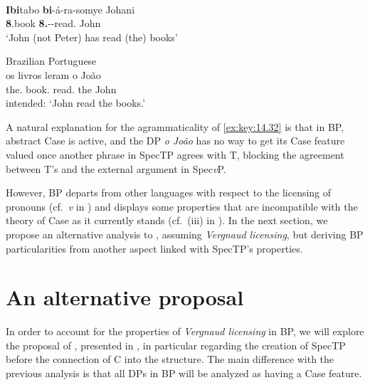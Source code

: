\documentclass[output=paper]{langsci/langscibook}
\begin{document}
\ea%
    \label{ex:key:14.31} \parencite[723]{Carstens2011}\\
    \gll    \textbf{Ibi}tabo \textbf{bi}-á-ra-somye Johani\\
            \textbf{8}.book \textbf{8.\Sm}-\Pst{}-read.\Pfv{} John\\
    \glt    ‘John (not Peter) has read (the) books’
\z

\ea\label{ex:key:14.32}Brazilian Portuguese\\
    \gll    \llap{*}os livros leram o João\\
            the.\Pl{} book.\Pl{} read.\Tpl{} the John\\
    \glt    intended: \enquote*{John read the books.}
\z

A natural explanation for the agrammaticality of \eqref{ex:key:14.32} is that
in \gls{BP}, abstract Case is active, and the DP \emph{o João} has no way to
get its Case feature valued once another phrase in SpecTP agrees with T,
blocking the agreement between T’s  and the external argument in
Spec\emph{v}P.

However, \gls{BP} departs from other  languages with respect to the
licensing of pronouns (cf.\ \emph{v} in ) and displays some
properties that are incompatible with the theory of Case as it currently stands
(cf.\ (iii) in ). In the next section, we propose an
alternative analysis to \textcite{AvelarGalves2011,AvelarGalves2016}, assuming
\emph{Vergnaud licensing}, but deriving \gls{BP} particularities from another
aspect linked with SpecTP’s properties.

\section{An alternative proposal}\label{sec:key:14.5}

In order to account for the properties of \emph{Vergnaud licensing} in
\gls{BP}, we will explore the proposal of
\textcite{AvelarGalves2011,AvelarGalves2016}, presented in
, in particular regarding the creation of SpecTP before
the connection of C into the structure. The main difference with the previous
analysis is that all DPs in \gls{BP} will be analyzed as having a Case
feature.
\end{document}
